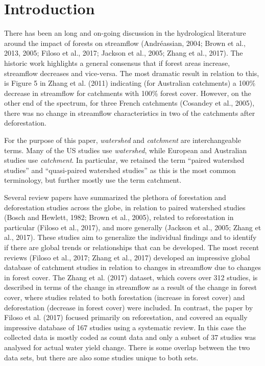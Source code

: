 \documentclass[]{elsarticle} %
\begin{document}
\hypertarget{introduction}{%
\section{Introduction}\label{introduction}}

There has been an long and on-going discussion in the hydrological literature around the impact of forests on streamflow (Andréassian, 2004; Brown et al., 2013, 2005; Filoso et al., 2017; Jackson et al., 2005; Zhang et al., 2017). The historic work highlights a general consensus that if forest areas increase, streamflow decreases and vice-versa. The most dramatic result in relation to this, is Figure 5 in Zhang et al. (2011) indicating (for Australian catchments) a 100\% decrease in streamflow for catchments with 100\% forest cover. However, on the other end of the spectrum, for three French catchments (Cosandey et al., 2005), there was no change in streamflow characteristics in two of the catchments after deforestation.

For the purpose of this paper, \emph{watershed} and \emph{catchment} are interchangeable terms. Many of the US studies use \emph{watershed}, while European and Australian studies use \emph{catchment}. In particular, we retained the term ``paired watershed studies'' and ``quasi-paired watershed studies'' as this is the most common terminology, but further mostly use the term catchment.

Several review papers have summarized the plethora of forestation and deforestation studies across the globe, in relation to paired watershed studies (Bosch and Hewlett, 1982; Brown et al., 2005), related to reforestation in particular (Filoso et al., 2017), and more generally (Jackson et al., 2005; Zhang et al., 2017). These studies aim to generalize the individual findings and to identify if there are global trends or relationships that can be developed. The most recent reviews (Filoso et al., 2017; Zhang et al., 2017) developed an impressive global database of catchment studies in relation to changes in streamflow due to changes in forest cover. The Zhang et al. (2017) dataset, which covers over 312 studies, is described in terms of the change in streamflow as a result of the change in forest cover, where studies related to both forestation (increase in forest cover) and deforestation (decrease in forest cover) were included. In contrast, the paper by Filoso et al. (2017) focused primarily on reforestation, and covered an equally impressive database of 167 studies using a systematic review. In this case the collected data is mostly coded as count data and only a subset of 37 studies was analysed for actual water yield change. There is some overlap between the two data sets, but there are also some studies unique to both sets.
\end{document}
